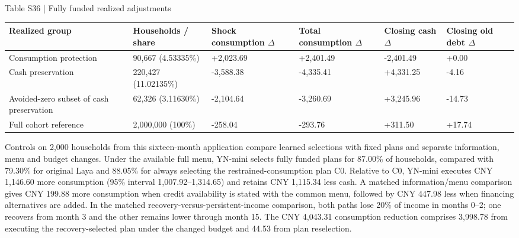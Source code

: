 \documentclass[10pt]{article}
\begin{document}
\begin{center}
\begin{minipage}{\textwidth}
\fontsize{8.5}{10.3}\selectfont
Table S36 | Fully funded realized adjustments
\par\vspace{4pt}
\begin{tabularx}{\textwidth}{@{}XXXXXX@{}}
\toprule
Realized group & Households / share & Shock consumption \ensuremath{\Delta} & Total consumption \ensuremath{\Delta} & Closing cash \ensuremath{\Delta} & Closing old debt \ensuremath{\Delta} \\
\midrule
Consumption protection & 90,667 (4.53335\%) & +2,023.69 & +2,401.49 & -2,401.49 & +0.00 \\
Cash preservation & 220,427 (11.02135\%) & -3,588.38 & -4,335.41 & +4,331.25 & -4.16 \\
Avoided-zero subset of cash preservation & 62,326 (3.11630\%) & -2,104.64 & -3,260.69 & +3,245.96 & -14.73 \\
Full cohort reference & 2,000,000 (100\%) & -258.04 & -293.76 & +311.50 & +17.74 \\
\bottomrule
\end{tabularx}
\par{}
\end{minipage}
\end{center}


\clearpage
Controls on 2,000 households from this sixteen-month application compare learned selections with fixed plans and separate information, menu and budget changes. Under the available full menu, YN-mini selects fully funded plans for 87.00\% of households, compared with 79.30\% for original Laya and 88.05\% for always selecting the restrained-consumption plan C0. Relative to C0, YN-mini executes CNY 1,146.60 more consumption (95\% interval 1,007.92--1,314.65) and retains CNY 1,115.34 less cash. A matched information/menu comparison gives CNY 199.88 more consumption when credit availability is stated with the common menu, followed by CNY 447.98 less when financing alternatives are added. In the matched recovery-versus-persistent-income comparison, both paths lose 20\% of income in months 0--2; one recovers from month 3 and the other remains lower through month 15. The CNY 4,043.31 consumption reduction comprises 3,998.78 from executing the recovery-selected plan under the changed budget and 44.53 from plan reselection.
\end{document}
